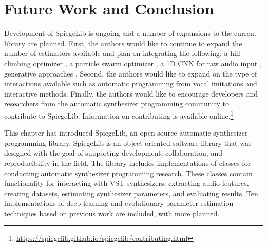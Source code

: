 \section{Future Work and Conclusion}
Development of SpiegeLib is ongoing and a number of expansions to the current library are planned. First, the authors would like to continue to expand the number of estimators available and plan on integrating the following: a hill climbing optimizer \cite{yee2018automatic}, a particle swarm optimizer \cite{heise2009automatic}, a 1D CNN for raw audio input \cite{barkan2019inversynth}, generative approaches \cite{esling2020flow, le2021improving}.  Second, the authors would like to expand on the type of interactions available such as automatic programming from vocal imitations \cite{mcartwright2014} and interactive methods. 
Finally, the authors would like to encourage developers and researchers from the automatic synthesizer programming community to contribute to SpiegeLib. Information on contributing is available online.\footnote{\url{https://spiegelib.github.io/spiegelib/contributing.html}} 

This chapter has introduced SpiegeLib, an open-source automatic synthesizer programming library. SpiegeLib is an object-oriented software library that was designed with the goal of supporting development, collaboration, and reproducibility in the field. The library includes implementations of classes for conducting automatic synthesizer programming research. These classes contain functionality for interacting with VST synthesizers, extracting audio features, creating datasets, estimating synthesizer parameters, and evaluating results. Ten implementations of deep learning and evolutionary parameter estimation techniques based on previous work are included, with more planned.